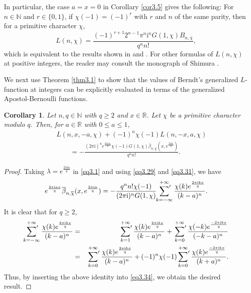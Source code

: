 \documentclass[reqno]{amsart}
\numberwithin{equation}{section}
\newtheorem{corollary}[thm]{Corollary}
\begin{document}
In particular, the case $a=x=0$ in Corollary \ref{cor3.5} gives the following: For $n\in\mathbb{N}$ and $r\in\{0,1\}$, if $\chi(-1)=(-1)^{r}$ with $r$ and $n$ of the same parity, then for a primitive character $\chi$,
\begin{equation}\label{eq3.32}
L(n,\chi)=\frac{(-1)^{r+1}2^{n-1}\pi^{n}\mathrm{i}^{n}G(1,\chi)B_{n,\overline{\chi}}}{q^{n}n!},
\end{equation}
which is equivalent to the results shown in \cite[pp. 442--443]{neukirch} and \cite[Theorem 10.3.1]{cohen}. For other formulas of $L(n,\chi)$ at positive integers, the reader may consult the monograph of Shimura \cite{shimura}.

We next use Theorem \ref{thm3.1} to show that the values of Berndt's generalized $L$-function at integers can be explicitly evaluated in terms of the generalized Apostol-Bernoulli functions.

\begin{corollary}\label{cor3.6} Let $n,q\in\mathbb{N}$ with $q\geqslant2$ and $x\in\mathbb{R}$. Let $\chi$ be a primitive character modulo $q$. Then, for $a\in\mathbb{R}$ with $0\leqslant a\leqslant1$,
\begin{eqnarray}\label{eq3.33}
&&L(n,x,-a,\chi)+(-1)^{n}\chi(-1)L(n,-x,a,\chi)\nonumber\\
&&\qquad=-\frac{(2\pi\mathrm{i})^{n}e^{\frac{2\pi\mathrm{i}ax}{q}}\chi(-1)G(1,\chi)\overline{\beta}_{n,\overline{\chi}}(x,e^{\frac{2\pi\mathrm{i}a}{q}})}{q^{n}n!}.
\end{eqnarray}
\end{corollary}

\begin{proof}
Taking $\lambda=e^{\frac{2\pi\mathrm{i}a}{q}}$ in \eqref{eq3.1} and using \eqref{eq3.29} and \eqref{eq3.31}, we have
\begin{equation}\label{eq3.34}
e^{\frac{2\pi\mathrm{i}ax}{q}}\overline{\beta}_{n,\overline{\chi}}(x,e^{\frac{2\pi\mathrm{i}a}{q}})=-\frac{q^{n}n!\chi(-1)}{(2\pi \mathrm{i})^{n}G(1,\chi)}\sideset{}{'}\sum_{k=-\infty}^{+\infty}\frac{\chi(k)e^{\frac{2\pi\mathrm{i}kx}{q}}}{(k-a)^{n}}.
\end{equation}
It is clear that for $q\geq2$,
\begin{eqnarray*}
\sideset{}{'}\sum_{k=-\infty}^{+\infty}\frac{\chi(k)e^{\frac{2\pi\mathrm{i}kx}{q}}}{(k-a)^{n}}&=&\sideset{}{'}\sum_{k=1}^{+\infty}\frac{\chi(k)e^{\frac{2\pi\mathrm{i}kx}{q}}}{(k-a)^{n}}+
\sideset{}{'}\sum_{k=0}^{+\infty}\frac{\chi(-k)e^{\frac{-2\pi\mathrm{i}kx}{q}}}{(-k-a)^{n}}\nonumber\\
&=&\sideset{}{'}\sum_{k=0}^{+\infty}\frac{\chi(k)e^{\frac{2\pi\mathrm{i}kx}{q}}}{(k-a)^{n}}+(-1)^{n}\chi(-1)
\sideset{}{'}\sum_{k=0}^{+\infty}\frac{\chi(k)e^{\frac{-2\pi\mathrm{i}kx}{q}}}{(k+a)^{n}}.
\end{eqnarray*}
Thus, by inserting the above identity into \eqref{eq3.34}, we obtain the desired result.
\end{proof}
\end{document}
